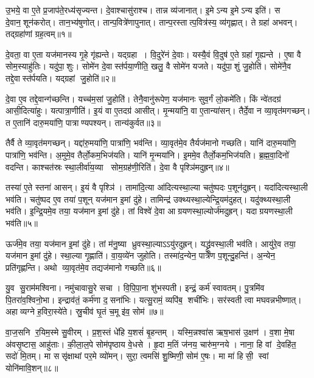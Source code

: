 उ॒भये॒ वा ए॒ते प्र॒जाप॑ते॒रध्य॑सृज्यन्त।
दे॒वाश्चासु॑राश्च।
तान्न व्य॑जानात्।
इ॒मेऽन्य इ॒मेऽन्य इति॑।
स दे॒वान॒शून॑करोत्।
तान॒भ्य॑षुणोत्।
तान्प॒वित्रे॑णापुनात्।
तान्प॒रस्तात्प॒वित्र॑स्य॒ व्य॑गृह्णात्।
ते ग्रहा॑ अभवन्।
तद्ग्रहा॑णां ग्रह॒त्वम्॥१॥

दे॒वता॒ वा ए॒ता यज॑मानस्य गृ॒हे गृ॑ह्यन्ते।
यद्ग्रहा।
वि॒दुरे॑नं दे॒वाः।
यस्यै॒वं वि॒दुष॑ ए॒ते ग्रहा॑ गृ॒ह्यन्ते।
ए॒षा वै सोम॒स्याहु॑तिः।
यदु॑पा॒शुः।
सोमे॑न दे॒वास्त॑र्पया॒णीति॒ खलु॒ वै सोमे॑न यजते।
यदु॑पा॒शुं जु॒होति॑।
सोमे॑नै॒व तद्दे॒वास्त॑र्पयति।
यद्ग्रहां जु॒होति॑॥२॥

दे॒वा ए॒व तद्दे॒वान्ग॑च्छन्ति।
यच्च॑म॒सां जु॒होति॑।
तेनै॒वानु॑रूपेण॒ यज॑मानः सुव॒र्गं लो॒कमे॑ति।
किं न्वे॑तदग्र॑ आसी॒दित्या॑हुः।
यत्पात्रा॒णीति॑।
इ॒यं वा ए॒तदग्र॑ आसीत्।
मृ॒न्मया॑नि॒ वा ए॒तान्या॑सन्।
तैर्दे॒वा न व्या॒वृत॑मगच्छन्।
त ए॒तानि॑ दारु॒मया॑णि॒ पात्राण्यपश्यन्।
तान्य॑कुर्वत॥३॥

तैर्वै ते व्या॒वृत॑मगच्छन्।
यद्दा॑रु॒मया॑णि॒ पात्रा॑णि॒ भव॑न्ति।
व्या॒वृत॑मे॒व तैर्यज॑मानो गच्छति।
यानि॑ दारु॒मया॑णि॒ पात्रा॑णि॒ भव॑न्ति।
अ॒मुमे॒व तैर्लो॒कम॒भिज॑यति।
यानि॑ मृ॒न्मया॑नि।
इ॒ममे॒व तैर्लो॒कम॒भिज॑यति।
ब्र॒ह्म॒वा॒दिनो॑ वदन्ति।
काश्चत॑स्रः स्था॒लीर्वा॑य॒व्या सोम॒ग्रह॑णी॒रिति॑।
दे॒वा वै पृश्ञि॑मदुह्रन्॥४॥

तस्या॑ ए॒ते स्तना॑ आसन्।
इ॒यं वै पृश्ञि॑।
तामा॑दि॒त्या आ॑दित्यस्था॒ल्या चतु॑ष्पदः प॒शून॑दुह्रन्।
यदा॑दित्यस्था॒ली भव॑ति।
चतु॑ष्पद ए॒व तया॑ प॒शून् यज॑मान इ॒मां दु॑हे।
तामिन्द्र॑ उक्थ्यस्था॒ल्येन्द्रि॒यम॑दुहत्।
यदु॑क्थ्यस्था॒ली भव॑ति।
इ॒न्द्रि॒यमे॒व तया॒ यज॑मान इ॒मां दु॑हे।
तां विश्वे॑ दे॒वा आग्रयणस्था॒ल्योर्ज॑मदुह्रन्।
यदाग्रयणस्था॒ली भव॑ति॥५॥

ऊर्ज॑मे॒व तया॒ यज॑मान इ॒मां दु॑हे।
तां म॑नु॒ष्या ध्रुवस्था॒ल्याऽऽयु॑रदुह्रन्।
यद्ध्रु॑वस्था॒ली भव॑ति।
आयु॑रे॒व तया॒ यज॑मान इ॒मां दु॑हे।
स्था॒ल्या गृ॒ह्णाति॑।
वा॒य॒व्ये॑न जुहोति।
तस्मा॑द॒न्येन॒ पात्रे॑ण प॒शून्दु॒हन्ति॑।
अ॒न्येन॒ प्रति॑गृह्णन्ति।
अथो व्या॒वृत॑मे॒व तद्यज॑मानो गच्छति॥६॥\anuvakamend[ग्र॒ह॒त्वं ग्रहां जु॒होत्य॑कुर्वतादुह्रन्नाग्रयणस्था॒ली भव॑ति॒ नव॑ च]

यु॒व सु॒राम॑मश्विना।
नमु॑चावासु॒रे सचा।
वि॒पि॒पा॒ना शु॑भस्पती।
इन्द्रं॒ कर्म॑ स्वावतम्।
पु॒त्रमि॑व पि॒तरा॑व॒श्विनो॒भा।
इन्द्राव॑तं॒ कर्म॑णा द॒सना॑भिः।
यत्सु॒रामं॒ व्यपि॑ब॒ शची॑भिः।
सर॑स्वती त्वा मघवन्नभीष्णात्।
अहाव्यग्ने ह॒विरा॒स्ये॑ते।
स्रु॒चीव॑ घृ॒तं च॒मू इ॑व॒ सोम॑॥७॥

वा॒ज॒सनि र॒यिम॒स्मे सु॒वीरम्।
प्र॒श॒स्तं धे॑हि य॒शसं॑ बृ॒हन्तम्।
यस्मि॒न्नश्वा॑स ऋष॒भास॑ उ॒क्षण॑।
व॒शा मे॒षा अ॑वसृ॒ष्टास॒ आहु॑ताः।
की॒ला॒ल॒पे सोम॑पृष्ठाय वे॒धसे।
हृ॒दा म॒तिं ज॑नय॒ चारु॑म॒ग्नये।
नाना॒ हि वां दे॒वहि॑त॒ सदो॑ मि॒तम्।
मा ससृ॑क्षाथां पर॒मे व्यो॑मन्।
सुरा॒ त्वमसि॑ शु॒ष्मिणी॒ सोम॑ ए॒षः।
मा मा॑ हिसी॒ स्वां योनि॑मावि॒शन्॥८॥

